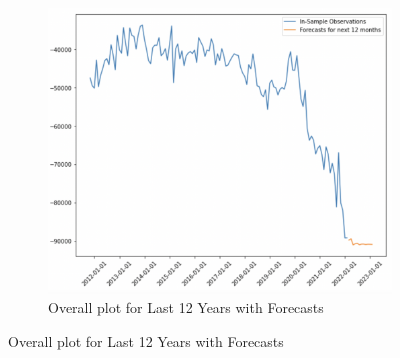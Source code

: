 \documentclass[12pt]{article}
\begin{document}
\begin{figure}[H]
	\begin{subfigure}{0.6\textwidth}
		\includegraphics[width=\textwidth]{images/plot.png}
		\caption{Overall plot for Last 12 Years with Forecasts}
	\end{subfigure}
\end{figure}
\end{document}
